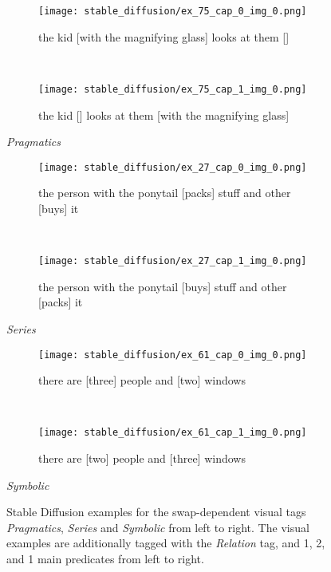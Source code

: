 \begin{figure}
\centering
    \begin{minipage}{.30\textwidth}
        \begin{subfigure}{\textwidth}
        \centering
        \texttt{[image: stable\_diffusion/ex\_75\_cap\_0\_img\_0.png]}
        \caption{the kid [with the magnifying glass] looks at them []}
        \end{subfigure}\\
        \begin{subfigure}{\textwidth}
        \centering
        \texttt{[image: stable\_diffusion/ex\_75\_cap\_1\_img\_0.png]}
        \caption{the kid [] looks at them [with the magnifying glass]}
        \end{subfigure}%
        \caption*{\textit{Pragmatics}}
    \end{minipage}
    \hfill
    \begin{minipage}{.30\textwidth}
        \begin{subfigure}{\textwidth}
        \centering
        \texttt{[image: stable\_diffusion/ex\_27\_cap\_0\_img\_0.png]}
        \caption{the person with the ponytail [packs] stuff and other [buys] it}
        \end{subfigure}\\
        \begin{subfigure}{\textwidth}
        \centering
        \texttt{[image: stable\_diffusion/ex\_27\_cap\_1\_img\_0.png]}
        \caption{the person with the ponytail [buys] stuff and other [packs] it}
        \end{subfigure}%
        \caption*{\textit{Series}}
    \end{minipage}
    \hfill
    \begin{minipage}{.30\textwidth}
        \begin{subfigure}{\textwidth}
        \centering
        \texttt{[image: stable\_diffusion/ex\_61\_cap\_0\_img\_0.png]}
        \caption{there are [three] people and [two] windows}
        \end{subfigure}\\
        \begin{subfigure}{\textwidth}
        \centering
        \texttt{[image: stable\_diffusion/ex\_61\_cap\_1\_img\_0.png]}
        \caption{there are [two] people and [three] windows}
        \end{subfigure}%
        \caption*{\textit{Symbolic}}
    \end{minipage}
    \caption{Stable Diffusion examples for the swap-dependent visual tags \textit{Pragmatics}, \textit{Series} and \textit{Symbolic} from left to right. The visual examples are additionally tagged with the \textit{Relation} tag, and 1, 2, and 1 main predicates from left to right.}
    \label{fig:stable-diffusion-examples-visual}
\end{figure}

